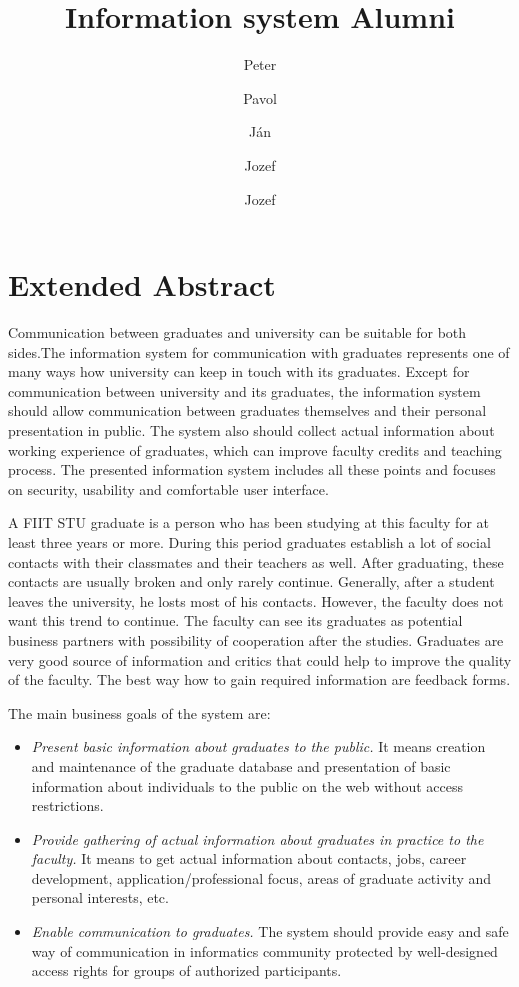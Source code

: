 \documentclass{iitsrc}
\title{Information system Alumni}
\author{Peter}{C\'ich}
\author{Pavol}{F\'abik}
\author{J\'an}{Garaj}
\author{Jozef}{Hergott}
\author{Jozef}{Hopko}
\begin{document}
\section*{Extended Abstract}

Communication between graduates and university can be suitable for both sides.The information system for communication with graduates represents one of many ways how university can keep in touch with its graduates. Except for communication between university and its graduates, the information system should allow communication between graduates themselves and their personal presentation in public. The system also should collect actual information about working experience of graduates, which can improve faculty credits and teaching process. The presented information system includes all these points and focuses on security, usability and comfortable user interface.


A FIIT STU graduate is a person who has been studying at this faculty for at least three years or more. During this period graduates establish a lot of social contacts with their classmates and their teachers as well. After graduating, these contacts are usually broken and only rarely continue. Generally, after a student leaves the university, he losts most of his contacts. However, the faculty does not want this trend to continue. The faculty can see its graduates as potential business partners with possibility of cooperation after the studies. Graduates are very good source of information and critics that could help to improve the quality of the faculty. The best way how to gain required information are feedback forms.

The main business goals of the system are:

\begin{itemize}
\item {\em Present basic information about graduates to the public.}
It means creation and maintenance of the graduate database and presentation of basic information about individuals to the public on the web without access restrictions.

\item {\em Provide gathering of actual information about graduates in practice to the faculty.} 
It means to get actual information about contacts, jobs, career development, application/professional focus, areas of graduate activity and personal interests, etc.

\item {\em Enable communication to graduates.}
The system should provide easy and safe way of communication in informatics community protected by well-designed access rights for groups of authorized participants.
\end{itemize}
\end{document}
